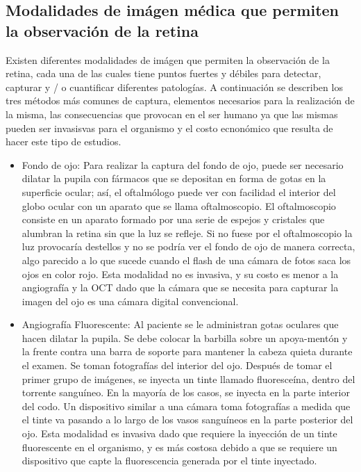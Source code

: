\subsection{Modalidades de im\'agen m\'edica que permiten la observaci\'on de la retina}
Existen diferentes modalidades de im\'agen que permiten la observaci\'on de la retina, cada una de las cuales tiene puntos fuertes y d\'ebiles para detectar, capturar y / o cuantificar diferentes patolog\'ias. A continuaci\'on se describen los tres m\'etodos m\'as comunes de captura, elementos necesarios para la realizaci\'on de la misma, las consecuencias que provocan en el ser humano ya que las mismas pueden ser invasisvas para el organismo y el costo ecnon\'omico que resulta de hacer este tipo de estudios.
\begin{itemize}
	\item Fondo de ojo: Para realizar la captura del fondo de ojo, puede ser necesario dilatar la pupila con f\'armacos que se depositan en forma de gotas en la superficie ocular; as\'i, el oftalm\'ologo puede ver con facilidad el interior del globo ocular con un aparato que se llama oftalmoscopio. El oftalmoscopio consiste en un aparato formado por una serie de espejos y cristales que alumbran la retina sin que la luz se refleje. Si no fuese por el oftalmoscopio la luz provocar\'ia destellos y no se podr\'ia ver el fondo de ojo de manera correcta, algo parecido a lo que sucede cuando el flash de una c\'amara de fotos saca los ojos en color rojo. Esta modalidad no es invasiva, y su costo es menor a la angiograf\'ia y la OCT dado que la cámara que se necesita para capturar la imagen del ojo es una c\'amara digital convencional.
\item Angiograf\'ia Fluorescente: Al paciente se le administran gotas oculares que hacen dilatar la pupila. Se debe colocar la barbilla sobre un apoya-ment\'on y la frente contra una barra de soporte para mantener la cabeza quieta durante el examen. Se toman fotograf\'ias del interior del ojo. Despu\'es de tomar el primer grupo de im\'agenes, se inyecta un tinte llamado fluoresce\'ina, dentro del  torrente sangu\'ineo. En la mayor\'ia de los casos, se inyecta en la parte interior del codo. Un dispositivo similar a una c\'amara toma fotograf\'ias a medida que el tinte va pasando a lo largo de los vasos sangu\'ineos en la parte posterior del ojo. Esta modalidad es invasiva dado que requiere la inyecci\'on de  un tinte fluorescente en el organismo, y es m\'as costosa debido a que se requiere un dispositivo que capte la fluorescencia generada por el tinte inyectado.

\end{itemize}

